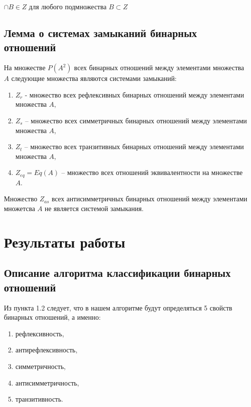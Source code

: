 \documentclass[bachelor, och, labwork]{shiza}
\begin{document}
	$\cap B \in Z $ для любого подмножества $B \subset Z $
	
	
	\subsection{Лемма о системах замыканий бинарных отношений}
	  На множестве $P(A^2)$ всех бинарных отношений между элементами множества $A$ следующие множества являются системами замыканий:
	
	\begin{enumerate}
		\item $Z_r$ - множество всех рефлексивных бинарных отношений между элементами множества $A$,
		\item $Z_s$ – множество всех симметричных бинарных отношений между элементами множества $A$,
		\item $Z_t$ – множество всех транзитивных бинарных отношений между элементами множества $A$,
		\item $Z_{eq} = Eq(A)$ – множество всех отношений эквивалентности на множестве $A$.
	\end{enumerate}

	Множество $Z_{as}$ всех антисимметричных бинарных отношений между элементами множетсва $A$ не является системой замыкания.
	
	\section{Результаты работы}
	\subsection{Описание алгоритма классификации бинарных отношений}
	
	Из пункта 1.2 следует, что в нашем алгоритме будут определяться 5 свойств бинарных отношений, а именно:
	
	\begin{enumerate}
		\item рефлексивность,
		\item антирефлексивность,
		\item симметричность,
		\item антисимметричность,
		\item транзитивность.
	\end{enumerate}
	
\end{document}
